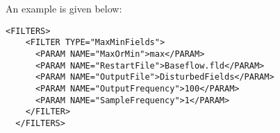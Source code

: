 An example is given below:

\begin{lstlisting}[style=XMLStyle]
  <FILTERS>
    <FILTER TYPE="MaxMinFields">
      <PARAM NAME="MaxOrMin">max</PARAM>
      <PARAM NAME="RestartFile">Baseflow.fld</PARAM>
      <PARAM NAME="OutputFile">DisturbedFields</PARAM>
      <PARAM NAME="OutputFrequency">100</PARAM>
      <PARAM NAME="SampleFrequency">1</PARAM>
    </FILTER>                                                                                                                                                                                 
  </FILTERS>
\end{lstlisting}
